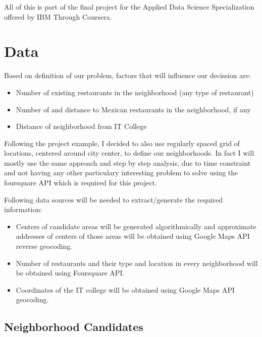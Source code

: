 \documentclass[11pt]{article}
\begin{document}
All of this is part of the final project for the Applied Data Science Specialization offered by IBM Through Coursera.

\cite{course} %

\section{Data}

Based on definition of our problem, factors that will influence our decission are:
\begin{itemize}
    \item Number of existing restaurants in the neighborhood (any type of restaurant)
    \item Number of and distance to Mexican restaurants in the neighborhood, if any
    \item Distance of neighborhood from IT College
\end{itemize}

Following the project example, I decided to also use regularly spaced grid of locations, centered around city center, to define our neighborhoods. In fact I will mostly use the same approach and step by step analysis, due to time constraint and not having any other particulary interesting problem to solve using the foursquare API which is required for this project.

\cite{courseNotebook} %
\newline

Following data sources will be needed to extract/generate the required information:
\begin{itemize}
    \item Centers of candidate areas will be generated algorithmically and approximate addresses of centers of those areas will be obtained using Google Maps API reverse geocoding.
    \item Number of restaurants and their type and location in every neighborhood will be obtained using Foursquare API.
    \item Coordinates of the IT college will be obtained using Google Maps API geocoding.
\end{itemize}

\noindent
\cite{foursquare}
\newline
\cite{googleApi}

\subsection{Neighborhood Candidates}
\end{document}
